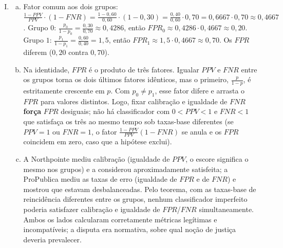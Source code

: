 \documentclass{dlproblemset}
\begin{document}
\begin{enumerate}[I)]
    \item
    \begin{enumerate}[(a)]
        \item Fator comum aos dois grupos: $\frac{1-PPV}{PPV}\cdot(1-FNR)=\frac{1-0{,}60}{0{,}60}\cdot(1-0{,}30)=\frac{0{,}40}{0{,}60}\cdot 0{,}70=0{,}6667\cdot 0{,}70\approx 0{,}4667$. Grupo $0$: $\frac{p_0}{1-p_0}=\frac{0{,}30}{0{,}70}\approx 0{,}4286$, então $FPR_0\approx 0{,}4286\cdot 0{,}4667\approx 0{,}20$. Grupo $1$: $\frac{p_1}{1-p_1}=\frac{0{,}60}{0{,}40}=1{,}5$, então $FPR_1\approx 1{,}5\cdot 0{,}4667\approx 0{,}70$. Os $FPR$ diferem ($0{,}20$ contra $0{,}70$).
        \item Na identidade, $FPR$ é o produto de três fatores. Igualar $PPV$ e $FNR$ entre os grupos torna os dois últimos fatores idênticos, mas o primeiro, $\frac{p}{1-p}$, é estritamente crescente em $p$. Com $p_0\neq p_1$, esse fator difere e arrasta o $FPR$ para valores distintos. Logo, fixar calibração e igualdade de $FNR$ \textbf{força} $FPR$ desiguais; não há classificador com $0 < PPV < 1$ e $FNR < 1$ que satisfaça os três ao mesmo tempo sob taxas-base diferentes (se $PPV = 1$ ou $FNR = 1$, o fator $\frac{1-PPV}{PPV}(1-FNR)$ se anula e os $FPR$ coincidem em zero, caso que a hipótese exclui).
        \item A Northpointe mediu calibração (igualdade de $PPV$, o escore significa o mesmo nos grupos) e a considerou aproximadamente satisfeita; a ProPublica mediu as taxas de erro (igualdade de $FPR$ e de $FNR$) e mostrou que estavam desbalanceadas. Pelo teorema, com as taxas-base de reincidência diferentes entre os grupos, nenhum classificador imperfeito poderia satisfazer calibração e igualdade de $FPR$/$FNR$ simultaneamente. Ambos os lados calcularam corretamente métricas legítimas e incompatíveis; a disputa era normativa, sobre qual noção de justiça deveria prevalecer.
    \end{enumerate}


\end{enumerate}
\end{document}
